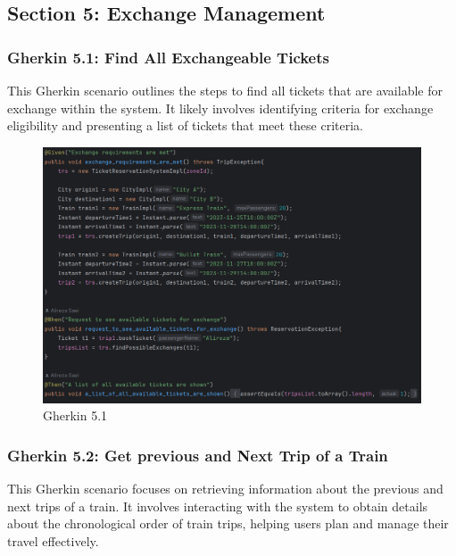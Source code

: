 \documentclass{article}
\begin{document}
\pagebreak

\subsection{Section 5: Exchange Management}
\subsubsection{Gherkin 5.1: Find All Exchangeable Tickets}

This Gherkin scenario outlines the steps to find all tickets that are available for exchange within the system. It likely involves identifying criteria for exchange eligibility and presenting a list of tickets that meet these criteria.

\begin{figure}[h]
  \centering
  \includegraphics[width=1.0\textwidth]{pictures/T5-1.png}
  \caption{Gherkin 5.1}
  \label{fig:your_label}
\end{figure}

\pagebreak

\subsubsection{Gherkin 5.2: Get previous and Next Trip of a Train}

This Gherkin scenario focuses on retrieving information about the previous and next trips of a train. It involves interacting with the system to obtain details about the chronological order of train trips, helping users plan and manage their travel effectively.
\end{document}
